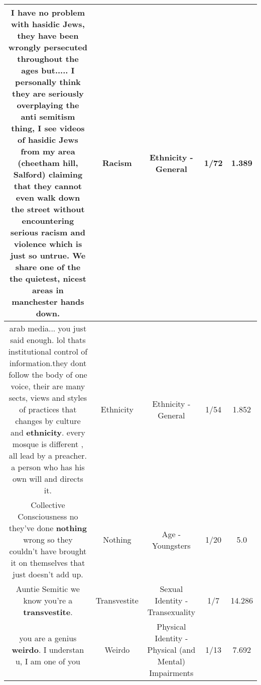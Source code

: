 \documentclass[11pt]{article}
\newlength\mylength
\begin{document}
\begin{center}
\begin{longtable}{|C{.65\mylength}|C{.30\mylength}|C{.12\mylength}|C{.12\mylength}|C{.12\mylength}|}
  \small I have no problem with hasidic Jews, they have been wrongly persecuted throughout the ages but..... I personally think they are seriously overplaying the anti semitism thing, I see videos of hasidic Jews from my area (cheetham hill, Salford) claiming that they cannot even walk down the street without encountering serious \textbf{racism} and violence which is just so untrue. We share one of the the quietest, nicest areas in manchester hands down.\normalsize   & Racism & Ethnicity - General & 1/72 & 1.389 \\  \hline
  \small arab media... you just said enough. lol thats institutional control of information.they dont follow the body of one voice, their are many sects, views and styles of practices that changes by culture and \textbf{ethnicity}. every mosque is different , all lead by a preacher. a person who has his own will and directs it.\normalsize   & Ethnicity & Ethnicity - General & 1/54 & 1.852 \\  \hline
  \small Collective Consciousness no they've done \textbf{nothing} wrong so they couldn't have brought it on themselves that just doesn't add up.\normalsize   & Nothing & Age - Youngsters & 1/20 & 5.0 \\  \hline
  \small Auntie Semitic we know you're a \textbf{transvestite}.\normalsize   & Transvestite & Sexual Identity - Transexuality & 1/7 & 14.286 \\  \hline
  \small you are a genius \textbf{weirdo}. I understan u, I am one of you\normalsize   & Weirdo & Physical Identity - Physical (and Mental) Impairments & 1/13 & 7.692 \\  \hline

\end{longtable}
\end{center}
\end{document}
